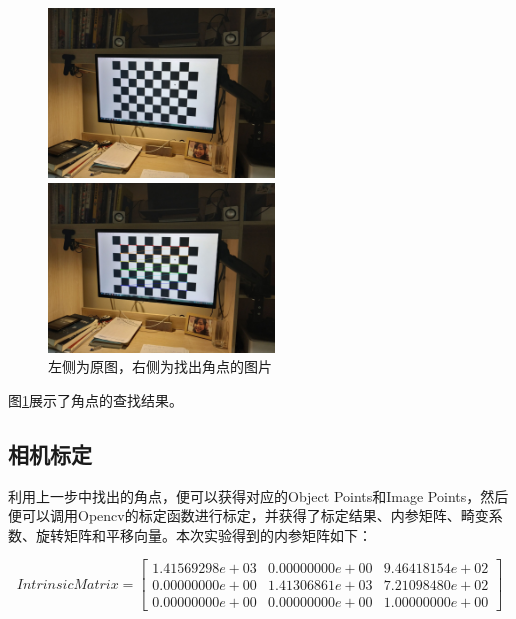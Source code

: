 \documentclass[]{article}
\begin{document}
\begin{figure}[htbp]
        \begin{minipage}[t]{0.4\textwidth}
            \centering
            \includegraphics[width=6cm]{../code/images/2.jpg}
        \end{minipage}
        \begin{minipage}[t]{0.4\textwidth}
            \centering
            \includegraphics[width=6cm]{../code/images/2_jpg_with_corners.jpg}
        \end{minipage}

        \caption{左侧为原图，右侧为找出角点的图片}
        \label{fig1}
    \end{figure}

    图\ref{fig1}展示了角点的查找结果。

    \subsection{相机标定}
    利用上一步中找出的角点，便可以获得对应的Object Points和Image Points，然后便可以调用Opencv的标定函数进行标定，并获得了标定结果、内参矩阵、畸变系数、旋转矩阵和平移向量。本次实验得到的内参矩阵如下：

    \begin{equation}
        IntrinsicMatrix = \left[
        \begin{matrix}
            1.41569298e+03 & 0.00000000e+00 & 9.46418154e+02 \\
            0.00000000e+00 & 1.41306861e+03 & 7.21098480e+02 \\
            0.00000000e+00 & 0.00000000e+00 & 1.00000000e+00
        \end{matrix}
        \right]
    \end{equation}
\end{document}
